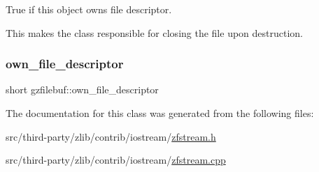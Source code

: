True if this object owns file descriptor. 

This makes the class responsible for closing the file upon destruction. \mbox{\label{classgzfilebuf_afc49b0c1665a94dbb51a37ce8065a268}} 
\subsubsection{\texorpdfstring{own\+\_\+file\+\_\+descriptor}{own\_file\_descriptor}}
{\footnotesize\ttfamily short gzfilebuf\+::own\+\_\+file\+\_\+descriptor\hspace{0.3cm}{\ttfamily [private]}}



The documentation for this class was generated from the following files\+:\begin{DoxyCompactItemize}
\item 
src/third-\/party/zlib/contrib/iostream/\mbox{\hyperlink{zfstream_8h}{zfstream.\+h}}\item 
src/third-\/party/zlib/contrib/iostream/\mbox{\hyperlink{zfstream_8cpp}{zfstream.\+cpp}}\end{DoxyCompactItemize}
